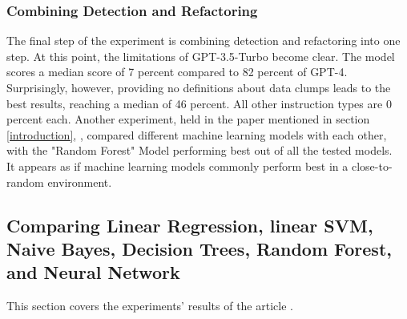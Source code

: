 \subsubsection{Combining Detection and Refactoring}
The final step of the experiment is combining detection and refactoring into one step. At this point, the limitations of GPT-3.5-Turbo become clear. The model scores a median score of 7 percent compared to 82 percent of GPT-4.
Surprisingly, however, providing no definitions about data clumps leads to the best results, reaching a median of 46 percent. 
All other instruction types are 0 percent each.
Another experiment, held in the paper mentioned in section \ref{introduction}, \cite[The effectiveness of supervised machine learning algorithms in predicting software refactoring]{aniche2020effectiveness}, compared different machine learning models with each other, with the "Random Forest" Model performing best out of all the tested models.\\
It appears as if machine learning models commonly perform best in a close-to-random environment.
\subsection{Comparing Linear Regression, linear SVM, Naive Bayes, Decision Trees, Random Forest, and Neural Network}
This section covers the experiments' results of the article \cite[The effectiveness of supervised machine learning algorithms in predicting software refactoring]{aniche2020effectiveness}.
